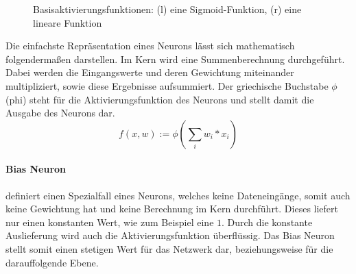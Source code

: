 \begin{figure}[ht!]
\centering
	\caption{Basisaktivierungsfunktionen: (l) eine Sigmoid-Funktion, (r) eine lineare Funktion}
	\label{fig:Aktivierungsfunktion}
\end{figure}

\noindent 
Die einfachste Repräsentation eines Neurons lässt sich mathematisch folgendermaßen darstellen.
Im Kern wird eine Summenberechnung durchgeführt. 
Dabei werden die Eingangswerte und deren Gewichtung miteinander multipliziert, sowie diese Ergebnisse aufsummiert.
Der griechische Buchstabe $\phi$ (phi) steht für die Aktivierungsfunktion des Neurons und stellt damit die Ausgabe des Neurons dar.
\begin{equation}
	f(x, w) := \phi ( \sum\limits_{i}{w_i * x_i})
	\label{eq:Aktivierungsfunktion}
\end{equation}


\paragraph{Bias Neuron} 
\label{sec:Bias Neuron}
definiert einen Spezialfall eines Neurons, welches keine Dateneingänge, somit auch keine Gewichtung hat und keine Berechnung im Kern durchführt. 
Dieses liefert nur einen konstanten Wert, wie zum Beispiel eine $1$. 
Durch die konstante Auslieferung wird auch die Aktivierungsfunktion überflüssig. 
Das Bias Neuron stellt somit einen stetigen Wert für das Netzwerk dar, beziehungsweise für die darauffolgende Ebene.

